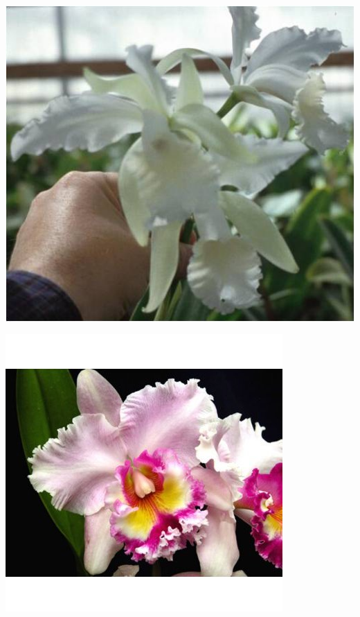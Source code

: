 \documentclass{article}
\begin{document}
\begin{center}
\includegraphics[height=0.925\paperheight]{../Cattleya.jpg}
\end{center}
\newpage

\begin{center}
\includegraphics[height=0.925\paperheight]{../Cattleya2.jpg}
\end{center}
\newpage
\end{document}

